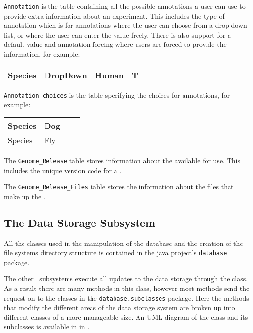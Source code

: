 \texttt{Annotation} is the table containing all the possible annotations a user can use to provide extra information about an experiment. This includes the type of annotation which is  for annotations where the user can choose from a drop down list, or  where the user can enter the value freely. There is also support for a default value and annotation forcing where users are forced to provide the information, for example:
\begin{center}
  \begin{tabular}{| l | l | l | l|}
    \hline
    Species & DropDown & Human & T \\ \hline
  \end{tabular}
\end{center}

\texttt{Annotation\_choices} is the table specifying the choices for  annotations, for example:\\
\begin{center}
  \begin{tabular}{| l | l | l | l|}
    \hline
    Species & Dog \\ \hline
    Species & Fly \\ \hline
  \end{tabular}
\end{center}

The \texttt{Genome\_Release} table stores information about the  available for use. This includes the unique version code for a \cite{UCSCGRVERSION}.

The \texttt{Genome\_Release\_Files} table stores the information about the files that make up the .

\subsection{The Data Storage Subsystem}
All the classes used in the manipulation of the database and the creation of the file systems directory structure is contained in the java project's \texttt{database} package.

The other \appName\ subsystems execute all updates to the data storage through the  class. As a result there are many methods in this class, however most methods send the request on to the classes in the \texttt{database.subclasses} package. Here the methods that modify the different areas of the data storage system are broken up into different classes of a more manageable size. An UML diagram of the  class and its subclasses is available in  in  .

